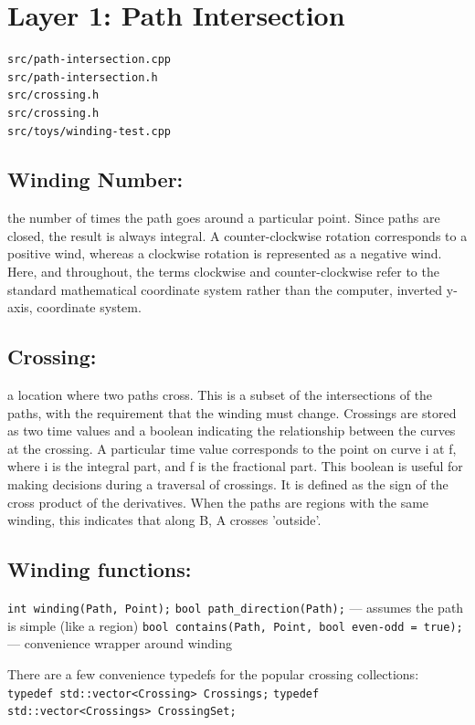 \documentclass[openany]{book}
\begin{document}
\section{Layer 1: Path Intersection}

\begin{verbatim}
src/path-intersection.cpp
src/path-intersection.h
src/crossing.h
src/crossing.h
src/toys/winding-test.cpp
\end{verbatim}

\subsection{Winding Number:}
 the number of times the path goes around a particular point. Since paths are closed, the result is always integral. A counter-clockwise rotation corresponds to a positive wind, whereas a clockwise rotation is represented as a negative wind. Here, and throughout, the terms clockwise and counter-clockwise refer to the standard mathematical coordinate system rather than the computer, inverted y-axis, coordinate system.

\subsection{Crossing:}
 a location where two paths cross. This is a subset of the intersections of the paths, with the requirement that the winding must change. Crossings are stored as two time values and a boolean indicating the relationship between the curves at the crossing. A particular time value corresponds to the point on curve i at f, where i is the integral part, and f is the fractional part. This boolean is useful for making decisions during a traversal of crossings. It is defined as the sign of the cross product of the derivatives. When the paths are regions with the same winding, this indicates that along B, A crosses 'outside'.

\subsection{Winding functions:}

\verb|int winding(Path, Point);|
\verb|bool path_direction(Path);|  —  assumes the path is simple (like a region)
\verb|bool contains(Path, Point, bool even-odd = true);|  —  convenience wrapper around winding

There are a few convenience typedefs for the popular crossing collections:
\verb|typedef std::vector<Crossing> Crossings;|
\verb|typedef std::vector<Crossings> CrossingSet;|
\end{document}
